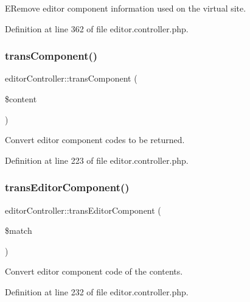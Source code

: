 E\+Remove editor component information used on the virtual site. 



Definition at line 362 of file editor.\+controller.\+php.

\mbox{\label{classeditorController_a9ef6499da56cf876c70813624ae4a2c0}} 
\subsubsection{\texorpdfstring{trans\+Component()}{transComponent()}}
{\footnotesize\ttfamily editor\+Controller\+::trans\+Component (\begin{DoxyParamCaption}\item[{}]{\$content }\end{DoxyParamCaption})}



Convert editor component codes to be returned. 



Definition at line 223 of file editor.\+controller.\+php.

\mbox{\label{classeditorController_a278ef1204d8129636bb8d30a0c91c5bb}} 
\subsubsection{\texorpdfstring{trans\+Editor\+Component()}{transEditorComponent()}}
{\footnotesize\ttfamily editor\+Controller\+::trans\+Editor\+Component (\begin{DoxyParamCaption}\item[{}]{\$match }\end{DoxyParamCaption})}



Convert editor component code of the contents. 



Definition at line 232 of file editor.\+controller.\+php.

\mbox{\label{classeditorController_acccfd1dab6c8c48a2eb232ae2e46e6bf}} 
